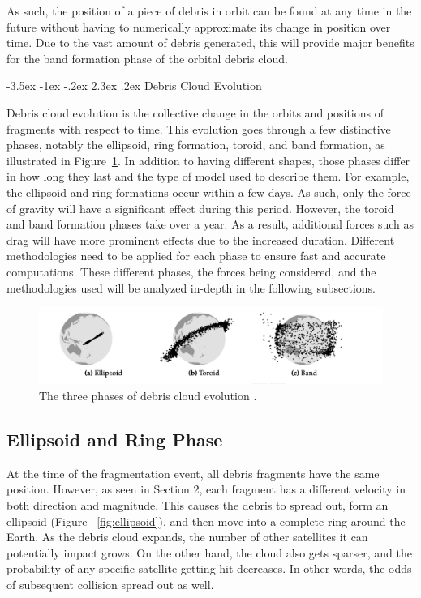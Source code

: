 \documentclass[a4paper, 12pt]{article}
\makeatletter
\renewcommand\section{\clearpage\newpage\@startsection {section}{1}{\z@}%
	{-3.5ex \@plus -1ex \@minus -.2ex}%
	{2.3ex \@plus.2ex}%
	{\normalfont\Large\bfseries}}
\makeatother
\begin{document}
As such, the position of a piece of debris in orbit can be found at any time in the future without having to numerically approximate its change in position over time. Due to the vast amount of debris generated, this will provide major benefits for the band formation phase of the orbital debris cloud.

\newpage
\section{Debris Cloud Evolution}

Debris cloud evolution is the collective change in the orbits and positions of fragments with respect to time. This evolution goes through a few distinctive phases, notably the ellipsoid,  ring formation, toroid, and band formation, as illustrated in Figure~\ref{fig:debrisphases}. In addition to having different shapes, those phases differ in how long they last and the type of model used to describe them. For example, the ellipsoid and ring formations occur within a few days. As such, only the force of gravity  will have a significant effect during this period.  However, the toroid and band formation phases take over a year. As a result, additional forces such as drag will have more prominent effects due to the increased duration. Different methodologies need to be applied for each phase to ensure fast and accurate computations. These different phases, the forces being considered, and the methodologies used will be analyzed in-depth in the following subsections.
\vspace{\baselineskip}

\begin{figure}[h]
	\centering
	\includegraphics[scale=0.45]{debrisphases}
	\caption{The three phases of debris cloud evolution \cite{letizia_space_2016}.}
	\label{fig:debrisphases}
\end{figure}


\subsection{Ellipsoid and Ring Phase}

At the time of the fragmentation event, all debris fragments have the same position. However, as seen in Section 2, each fragment has a different velocity in both direction and magnitude. This causes the debris to spread out, form an ellipsoid (Figure ~\ref{fig:ellipsoid}), and then move into a complete ring around the Earth. As the debris cloud expands, the number of other satellites it can potentially impact grows. On the other hand, the cloud also gets sparser, and the probability of any specific satellite getting hit decreases. In other words, the odds of subsequent collision spread out as well.
\end{document}
